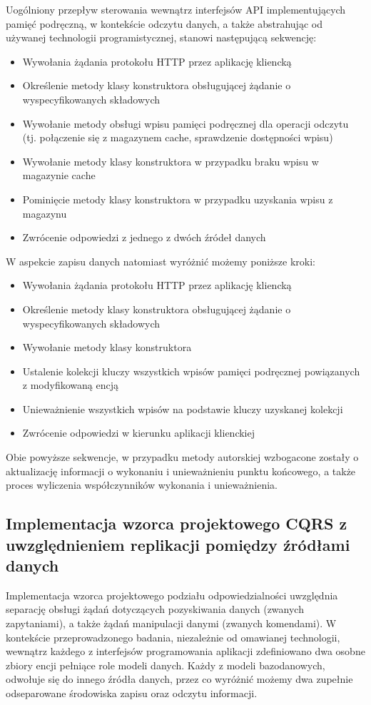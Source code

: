 Uogólniony przepływ sterowania wewnątrz interfejsów API implementujących pamięć podręczną, w kontekście odczytu danych, a także abstrahując od używanej technologii programistycznej, stanowi następującą sekwencję:

\begin{itemize}
    \item Wywołania żądania protokołu HTTP przez aplikację kliencką
    \item Określenie metody klasy konstruktora obsługującej żądanie o wyspecyfikowanych składowych
    \item Wywołanie metody obsługi wpisu pamięci podręcznej dla operacji odczytu (tj. połączenie się z magazynem cache, sprawdzenie dostępności wpisu)
    \item Wywołanie metody klasy konstruktora w przypadku braku wpisu w magazynie cache
    \item Pominięcie metody klasy konstruktora w przypadku uzyskania wpisu z magazynu
    \item Zwrócenie odpowiedzi z jednego z dwóch źródeł danych
\end{itemize}

W aspekcie zapisu danych natomiast wyróżnić możemy poniższe kroki:

\begin{itemize}
    \item Wywołania żądania protokołu HTTP przez aplikację kliencką
    \item Określenie metody klasy konstruktora obsługującej żądanie o wyspecyfikowanych składowych
    \item Wywołanie metody klasy konstruktora
    \item Ustalenie kolekcji kluczy wszystkich wpisów pamięci podręcznej powiązanych z modyfikowaną encją
    \item Unieważnienie wszystkich wpisów na podstawie kluczy uzyskanej kolekcji
    \item Zwrócenie odpowiedzi w kierunku aplikacji klienckiej
\end{itemize}

Obie powyższe sekwencje, w przypadku metody autorskiej wzbogacone zostały o aktualizację informacji o wykonaniu i unieważnieniu punktu końcowego, a także proces wyliczenia współczynników wykonania i unieważnienia. 
\subsection*{Implementacja wzorca projektowego CQRS z uwzględnieniem replikacji pomiędzy źródłami danych}
Implementacja wzorca projektowego podziału odpowiedzialności uwzględnia separację obsługi żądań dotyczących pozyskiwania danych (zwanych zapytaniami), a także żądań manipulacji danymi (zwanych komendami). W kontekście przeprowadzonego badania, niezależnie od omawianej technologii, wewnątrz każdego z interfejsów programowania aplikacji zdefiniowano dwa osobne zbiory encji pełniące role modeli danych. Każdy z modeli bazodanowych, odwołuje się do innego źródła danych, przez co wyróżnić możemy dwa zupełnie odseparowane środowiska zapisu oraz odczytu informacji.

